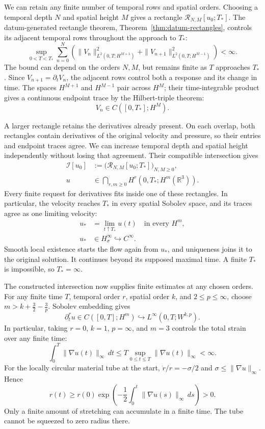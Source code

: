 We can retain any finite number of temporal rows and spatial orders.
Choosing a temporal depth \(N\) and spatial height \(M\) gives a rectangle
\(\mathcal R_{N,M}[u_0;T_*]\). The datum-generated rectangle theorem,
Theorem~\ref{thm:datum-rectangles}, controls its adjacent temporal rows
throughout the approach to \(T_*\):
\[
 \sup_{0<T<T_*}\sum_{n=0}^{N}\left(
 \|V_n\|_{L^2(0,T;H^{M+1})}^2
 +\|V_{n+1}\|_{L^2(0,T;H^{M-1})}^2
 \right)<\infty.
\]
The bound can depend on the orders \(N,M\), but remains finite as
\(T\) approaches \(T_*\). Since \(V_{n+1}=\partial_tV_n\), the
adjacent rows control both a response and its change in time. The spaces
\(H^{M+1}\) and \(H^{M-1}\) pair across \(H^M\); their time-integrable
product gives a continuous endpoint trace by the Hilbert-triple theorem:
\[
 V_n\in C([0,T_*];H^M).
\]

A larger rectangle retains the derivatives already present. On each
overlap, both rectangles contain derivatives of the original velocity and
pressure, so their entries and endpoint traces agree. We can increase
temporal depth and spatial height independently without losing that
agreement. Their compatible intersection gives
\[
 \begin{aligned}
 \mathcal I[u_0]
 &:=\bigl(\mathcal R_{N,M}[u_0;T_*]\bigr)_{N,M\ge0},\\
 u&\in\bigcap_{r,m\ge0}H^r(0,T_*;H^m(\mathbb R^3)).
 \end{aligned}
\]
Every finite request for derivatives fits inside one of these rectangles.
In particular, the velocity reaches \(T_*\) in every spatial Sobolev
space, and its traces agree as one limiting velocity:
\[
 \begin{aligned}
 u_*&=\lim_{t\uparrow T_*}u(t)\quad\text{in every }H^m,\\
 u_*&\in H^\infty_\sigma\hookrightarrow C^\infty.
 \end{aligned}
\]
Smooth local existence starts the flow again from \(u_*\), and uniqueness
joins it to the original solution. It continues beyond its supposed
maximal time. A finite \(T_*\) is impossible, so \(T_*=\infty\).

The constructed intersection now supplies finite estimates at any chosen
orders. For any finite time \(T\), temporal order \(r\), spatial order
\(k\), and \(2\le p\le\infty\), choose
\(m>k+\tfrac32-\tfrac3p\). Sobolev embedding gives
\[
 \partial_t^ru\in C([0,T];H^m)
 \hookrightarrow L^\infty(0,T;W^{k,p}).
\]
In particular, taking \(r=0\), \(k=1\), \(p=\infty\), and \(m=3\)
controls the total strain over any finite time:
\[
 \int_0^T\|\nabla u(t)\|_\infty\,dt
 \le T\sup_{0\le t\le T}\|\nabla u(t)\|_\infty<\infty.
\]
For the locally circular material tube at the start,
\(\dot r/r=-\sigma/2\) and \(\sigma\le\|\nabla u\|_\infty\). Hence
\[
 r(t)\ge r(0)\exp\!\left(
 -\frac12\int_0^t\|\nabla u(s)\|_\infty\,ds
 \right)>0.
\]
Only a finite amount of stretching can accumulate in a finite time.
The tube cannot be squeezed to zero radius there.

\endgroup
